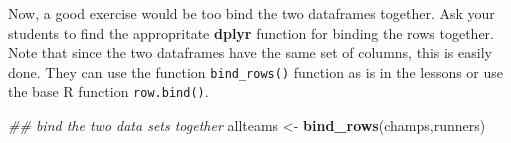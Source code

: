 \documentclass[]{book}
\newenvironment{Shaded}{\begin{snugshade}}{\end{snugshade}}
\newcommand{\CommentTok}[1]{\textcolor[rgb]{0.56,0.35,0.01}{\textit{#1}}}
\newcommand{\DataTypeTok}[1]{\textcolor[rgb]{0.13,0.29,0.53}{#1}}
\newcommand{\KeywordTok}[1]{\textcolor[rgb]{0.13,0.29,0.53}{\textbf{#1}}}
\newcommand{\NormalTok}[1]{#1}
\newcommand{\OperatorTok}[1]{\textcolor[rgb]{0.81,0.36,0.00}{\textbf{#1}}}
\newcommand{\StringTok}[1]{\textcolor[rgb]{0.31,0.60,0.02}{#1}}
\begin{document}
\begin{Shaded}
\end{Shaded}

Now, a good exercise would be too bind the two dataframes together. Ask your students to find the appropritate \textbf{dplyr} function for binding the rows together. Note that since the two dataframes have the same set of columns, this is easily done. They can use the function \texttt{bind\_rows()} function as is in the lessons or use the base R function \texttt{row.bind()}.

\begin{Shaded}
\begin{Highlighting}[]
\CommentTok{## bind the two data sets together}
\NormalTok{allteams <-}\StringTok{ }\KeywordTok{bind_rows}\NormalTok{(champs,runners)}
\end{Highlighting}
\end{Shaded}
\end{document}
